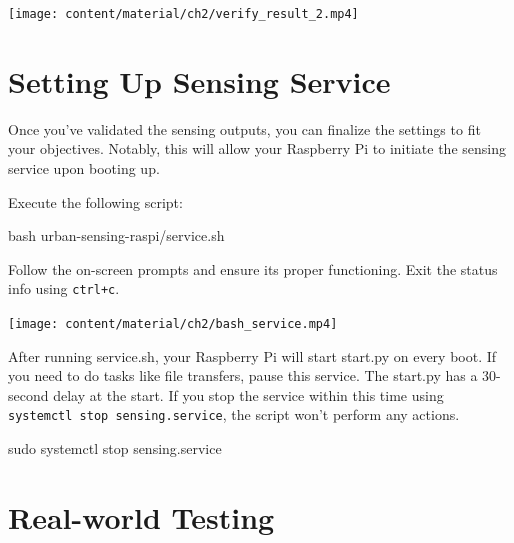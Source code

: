 \documentclass[
  letterpaper,
]{scrbook}
\newenvironment{Shaded}{\begin{snugshade}}{\end{snugshade}}
\newcommand{\FunctionTok}[1]{\textcolor[rgb]{0.28,0.35,0.67}{#1}}
\newcommand{\NormalTok}[1]{\textcolor[rgb]{0.00,0.23,0.31}{#1}}
\begin{document}
\texttt{[image: content/material/ch2/verify\_result\_2.mp4]}

\section{Setting Up Sensing Service}\label{setting-up-sensing-service}

Once you've validated the sensing outputs, you can finalize the settings
to fit your objectives. Notably, this will allow your Raspberry Pi to
initiate the sensing service upon booting up.

Execute the following script:

\begin{Shaded}
\begin{Highlighting}[]
\FunctionTok{bash}\NormalTok{ urban{-}sensing{-}raspi/service.sh}
\end{Highlighting}
\end{Shaded}

Follow the on-screen prompts and ensure its proper functioning. Exit the
status info using \texttt{ctrl+c}.

\texttt{[image: content/material/ch2/bash\_service.mp4]}

\begin{tcolorbox}[enhanced jigsaw, leftrule=.75mm, opacitybacktitle=0.6, toprule=.15mm, colback=white, colbacktitle=quarto-callout-note-color!10!white, toptitle=1mm, title=\textcolor{quarto-callout-note-color}{\faInfo}\hspace{0.5em}{Note}, arc=.35mm, coltitle=black, opacityback=0, left=2mm, bottomtitle=1mm, colframe=quarto-callout-note-color-frame, titlerule=0mm, breakable, bottomrule=.15mm, rightrule=.15mm]

After running service.sh, your Raspberry Pi will start start.py on every
boot. If you need to do tasks like file transfers, pause this service.
The start.py has a 30-second delay at the start. If you stop the service
within this time using \texttt{systemctl\ stop\ sensing.service}, the
script won't perform any actions.

\begin{Shaded}
\begin{Highlighting}[]
\FunctionTok{sudo}\NormalTok{ systemctl stop sensing.service}
\end{Highlighting}
\end{Shaded}

\end{tcolorbox}

\section{Real-world Testing}\label{real-world-testing}
\end{document}
